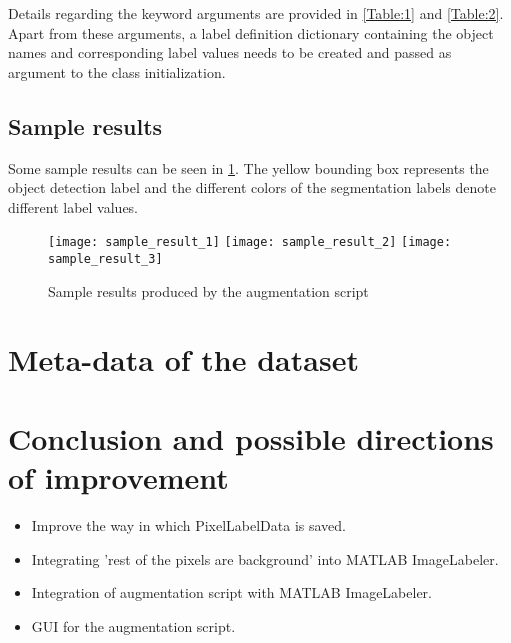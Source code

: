 \documentclass[paper=a4,11pt,parskip=half,toc=listof]{scrartcl}
\begin{document}
Details regarding the keyword arguments are provided in \ref{Table:1} and \ref{Table:2}. Apart from these arguments, a label definition dictionary containing the object names and corresponding label values needs to be created and passed as argument to the class initialization.

\subsection{Sample results}
Some sample results can be seen in \ref{Fig:8}. The yellow bounding box represents the object detection label and the different colors of the segmentation labels denote different label values.

	\begin{figure}[htb!]
		\centering
		\texttt{[image: sample\_result\_1]}
		\texttt{[image: sample\_result\_2]}
		\texttt{[image: sample\_result\_3]}
		\caption{Sample results produced by the augmentation script}
		\label{Fig:8}
	\end{figure}
	

\section{Meta-data of the dataset}


\section{Conclusion and possible directions of improvement}
	\begin{itemize}
		\item Improve the way in which PixelLabelData is saved.
		\item Integrating 'rest of the pixels are background' into MATLAB ImageLabeler.
		\item Integration of augmentation script with MATLAB ImageLabeler.
		\item GUI for the augmentation script.
	\end{itemize}

\newpage
{}
\begin{thebibliography}{9}

\end{thebibliography}
\end{document}
